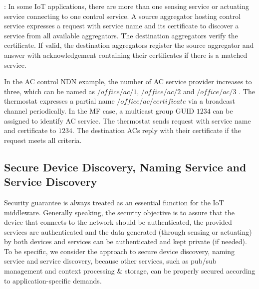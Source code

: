 \vspace{1mm}: In some IoT applications, there are more than one sensing service or actuating service connecting to one control service. A source aggregator hosting control service expresses a request with service name and its certificate to discover a service from all  available aggregators. The destination aggregators verify the certificate. If valid, the destination aggregators register the source aggregator and  answer with acknowledgement containing their certificates if there is a matched service.

In the AC control NDN example, the number of AC service provider increases to three, which can be named as $/office/ac/1$, $/office/ac/2$ and $/office/ac/3$ . The thermostat expresses a partial name $/office/ac/certificate$ via a broadcast channel periodically. In the MF case, a multicast group GUID $1234$ can be assigned to identify AC service. The thermostat sends request with service name and certificate to $1234$. The destination ACs reply with their certificate if the request meets all criteria.

\subsection{Secure Device Discovery, Naming Service and Service Discovery}
Security guarantee is always treated as an essential function for the IoT middleware. Generally speaking, the security objective is to assure that the device that connects to the network should be authenticated, the provided services are authenticated and the data generated (through sensing or actuating) by both devices and services can be authenticated and kept private (if needed). To be specific, we consider the approach to secure device discovery, naming service and service discovery, because other services, such as pub/sub management and context processing \& storage, can be properly secured according to application-specific demands.

